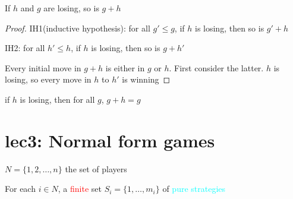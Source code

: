 \documentclass[11pt]{article}
\begin{document}
\begin{lemma}
If $h$ and $g$ are losing, so is $g+h$
\end{lemma}
\begin{proof}
IH1(inductive hypothesis): for all $g'\le g$, if $h$ is losing, then so is $g'+h$

IH2: for all $h'\le h$, if $h$ is losing, then so is $g+h'$

Every initial move in $g+h$ is either in $g$ or $h$. First consider the latter.
$h$ is losing, so every move in $h$ to $h'$ is winning
\end{proof}


\begin{corollary}
if $h$ is losing, then for all $g$, $g+h=g$
\end{corollary}
\section{lec3: Normal form games}
\label{sec:org57bf819}
\(N=\{1,2,\dots,n\}\) the set of players

For each \(i\in N\), a \textcolor{red}{finite} set \(S_i=\{1,\dots,m_i\}\) of 
\textcolor{cyan}{pure strategies} 
\end{document}
